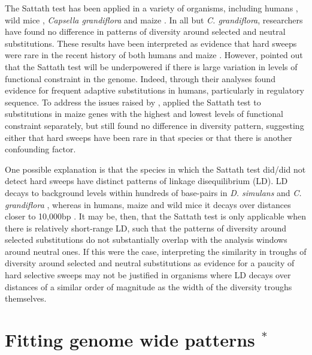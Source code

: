 The Sattath test has been applied in a variety of organisms, including humans \citep{RN162}, wild mice \citep{RN122}, \textit{Capsella grandiflora} \citep{RN236} and maize \citep{RN230}. In all but \textit{C. grandiflora}, researchers have found no difference in patterns of diversity around selected and neutral substitutions. These results have been interpreted as evidence that hard sweeps were rare in the recent history of both humans \citep{RN162} and maize \citep{RN230}. However, \cite{RN237} pointed out that the Sattath test will be underpowered if there is large variation in levels of functional constraint in the genome. Indeed, through their analyses \cite{RN237} found evidence for frequent adaptive substitutions in humans, particularly in regulatory sequence. To address the issues raised by \cite{RN237}, \cite{RN230} applied the Sattath test to substitutions in maize genes with the highest and lowest levels of functional constraint separately, but still found no difference in diversity pattern, suggesting either that hard sweeps have been rare in that species or that there is another confounding factor.
 
One possible explanation is that the species in which the Sattath test did/did not detect hard sweeps have distinct patterns of linkage disequilibrium (LD). LD decays to background levels within hundreds of base-pairs in \textit{D. simulans} \citep{RN283} and \textit{C. grandiflora} \citep{RN271}, whereas in humans, maize and wild mice it decays over distances closer to 10,000bp \citep{RN273,RN327, RN272}. It may be, then, that the Sattath test is only applicable when there is relatively short-range LD, such that the patterns of diversity around selected substitutions do not substantially overlap with the analysis windows around neutral ones. If this were the case, interpreting the similarity in troughs of diversity around selected and neutral substitutions as evidence for a paucity of hard selective sweeps may not be justified in organisms where LD decays over distances of a similar order of magnitude as the width of the diversity troughs themselves.
   	        	  
\section[Fitting genome wide patterns]{Fitting genome wide patterns $^*$}


